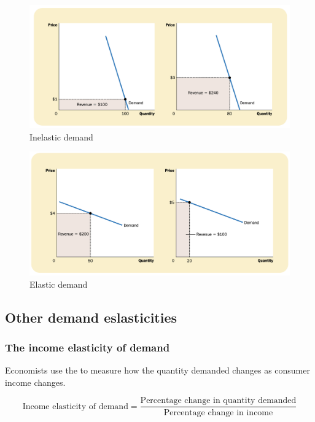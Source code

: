 \begin{figure}[!ht]
  \centering
  \includegraphics[width=\textwidth]{pics/inelastic-demand}
  \caption{Inelastic demand}
  \label{fig:inelastic-demand}
\end{figure}

\begin{figure}[!ht]
  \centering
  \includegraphics[width=\textwidth]{pics/elastic-demand}
  \caption{Elastic demand}
  \label{fig:elastic-demand}
\end{figure}

\subsection{Other demand eslasticities}

\subsubsection{The income elasticity of demand}

Economists use the  to measure how the quantity demanded changes as consumer income changes.

\begin{equation}
  \text{Income elasticity of demand} = \frac{\text{Percentage change in quantity demanded}}{\text{Percentage change in income}}
\end{equation}


